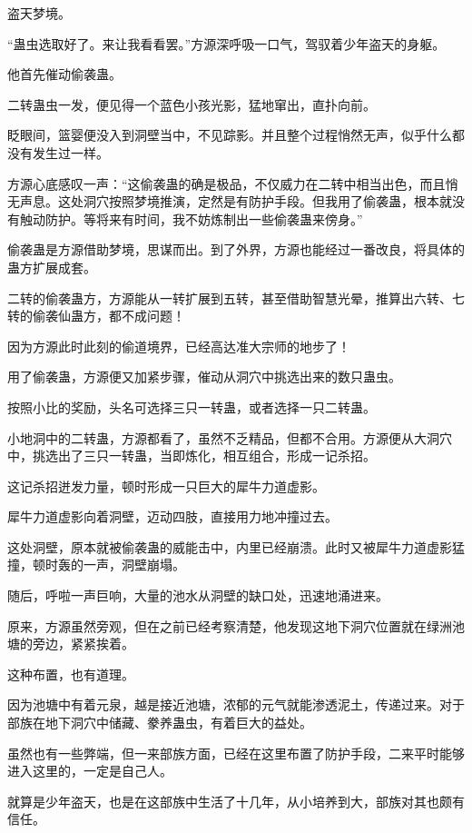 
\begin{this_body}

盗天梦境。

“蛊虫选取好了。来让我看看罢。”方源深呼吸一口气，驾驭着少年盗天的身躯。

他首先催动偷袭蛊。

二转蛊虫一发，便见得一个蓝色小孩光影，猛地窜出，直扑向前。

眨眼间，篮婴便没入到洞壁当中，不见踪影。并且整个过程悄然无声，似乎什么都没有发生过一样。

方源心底感叹一声：“这偷袭蛊的确是极品，不仅威力在二转中相当出色，而且悄无声息。这处洞穴按照梦境推演，定然是有防护手段。但我用了偷袭蛊，根本就没有触动防护。等将来有时间，我不妨炼制出一些偷袭蛊来傍身。”

偷袭蛊是方源借助梦境，思谋而出。到了外界，方源也能经过一番改良，将具体的蛊方扩展成套。

二转的偷袭蛊方，方源能从一转扩展到五转，甚至借助智慧光晕，推算出六转、七转的偷袭仙蛊方，都不成问题！

因为方源此时此刻的偷道境界，已经高达准大宗师的地步了！

用了偷袭蛊，方源便又加紧步骤，催动从洞穴中挑选出来的数只蛊虫。

按照小比的奖励，头名可选择三只一转蛊，或者选择一只二转蛊。

小地洞中的二转蛊，方源都看了，虽然不乏精品，但都不合用。方源便从大洞穴中，挑选出了三只一转蛊，当即炼化，相互组合，形成一记杀招。

这记杀招迸发力量，顿时形成一只巨大的犀牛力道虚影。

犀牛力道虚影向着洞壁，迈动四肢，直接用力地冲撞过去。

这处洞壁，原本就被偷袭蛊的威能击中，内里已经崩溃。此时又被犀牛力道虚影猛撞，顿时轰的一声，洞壁崩塌。

随后，呼啦一声巨响，大量的池水从洞壁的缺口处，迅速地涌进来。

原来，方源虽然旁观，但在之前已经考察清楚，他发现这地下洞穴位置就在绿洲池塘的旁边，紧紧挨着。

这种布置，也有道理。

因为池塘中有着元泉，越是接近池塘，浓郁的元气就能渗透泥土，传递过来。对于部族在地下洞穴中储藏、豢养蛊虫，有着巨大的益处。

虽然也有一些弊端，但一来部族方面，已经在这里布置了防护手段，二来平时能够进入这里的，一定是自己人。

就算是少年盗天，也是在这部族中生活了十几年，从小培养到大，部族对其也颇有信任。


\end{this_body}
